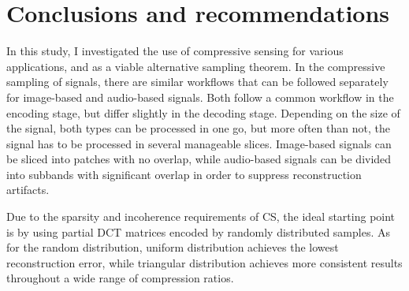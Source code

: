 \chapter{Conclusions and recommendations}
\label{chap:conc}


In this study, I investigated the use of compressive sensing for various applications, and as a viable alternative sampling theorem. In the compressive sampling of signals, there are similar workflows that can be followed separately for image-based and audio-based signals. Both follow a common workflow in the encoding stage, but differ slightly in the decoding stage. Depending on the size of the signal, both types can be processed in one go, but more often than not, the signal has to be processed in several manageable slices. Image-based signals can be sliced into patches with no overlap, while audio-based signals can be divided into subbands with significant overlap in order to suppress reconstruction artifacts.

Due to the sparsity and incoherence requirements of CS, the ideal starting point is by using partial DCT matrices encoded by randomly distributed samples. As for the random distribution, uniform distribution achieves the lowest reconstruction error, while triangular distribution achieves more consistent results throughout a wide range of compression ratios.